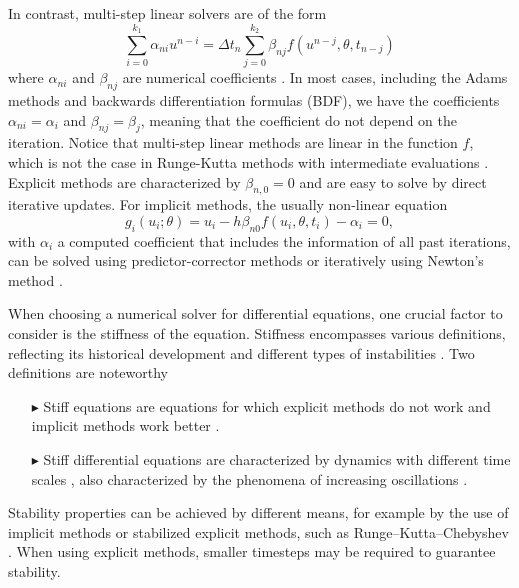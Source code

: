 In contrast, multi-step linear solvers are of the form 
\begin{equation}
    \sum_{i=0}^{k_1} \alpha_{ni} u^{n-i} 
    =
    \Delta t_n \sum_{j=0}^{k_2} \beta_{nj} f(u^{n-j}, \theta, t_{n-j})
\end{equation}
where $\alpha_{ni}$ and $\beta_{nj}$ are numerical coefficients \cite{hairer-solving-1}.
In most cases, including the Adams methods and backwards differentiation formulas (BDF), we have the coefficients $\alpha_{ni} = \alpha_i$ and $\beta_{nj}=\beta_j$, meaning that the coefficient do not depend on the iteration. 
Notice that multi-step linear methods are linear in the function $f$, which is not the case in Runge-Kutta methods with intermediate evaluations \cite{ascher2008numerical}.
Explicit methods are characterized by $\beta_{n, 0} = 0$ and are easy to solve by direct iterative updates. 
For implicit methods, the usually non-linear equation 
\begin{equation}
    g_i(u_i; \theta) = u_i - h \beta_{n0} f(u_i, \theta, t_i) - \alpha_i = 0,
    \label{eq:solver-constriant-example}
\end{equation}
with $\alpha_i$ a computed coefficient that includes the information of all past iterations, can be solved using predictor-corrector methods \cite{hairer-solving-1} or iteratively using Newton's method \cite{SUNDIALS-hindmarsh2005sundials}.  

When choosing a numerical solver for differential equations, one crucial factor to consider is the stiffness of the equation.
Stiffness encompasses various definitions, reflecting its historical development and different types of instabilities \cite{Dahlquist_1985}.
Two definitions are noteworthy
\begin{enumerate}
    \item[$ \blacktriangleright$] Stiff equations are equations for which explicit methods do not work and implicit methods work better \cite{hairer-solving-2}.
    \item[$ \blacktriangleright$] Stiff differential equations are characterized by dynamics with different time scales \cite{hairer-solving-2, kim_stiff_2021}, also characterized by the phenomena of increasing oscillations \cite{Dahlquist_1985}.
\end{enumerate} 
Stability properties can be achieved by different means, for example by the use of implicit methods or stabilized explicit methods, such as Runge–Kutta–Chebyshev \cite{van1980internal, hairer-solving-2}. 
When using explicit methods, smaller timesteps may be required to guarantee stability. 

